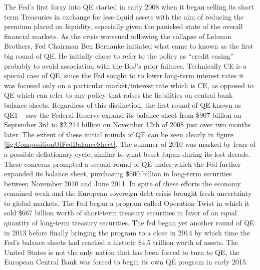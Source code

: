 \documentclass[12pt]{report}
\begin{document}
The Fed's first foray into QE started in early 2008 when it began selling its short term Treasuries in exchange for less-liquid assets with the aim of reducing the premium placed on liquidity, especially given the panicked state of the overall financial markets.\autocite[467]{blinder2010quantitative}
As the crisis worsened following the collapse of Lehman Brothers, Fed Chairman Ben Bernanke initiated what came to known as the first big round of QE. He initially chose to refer to the policy as ``credit easing'' probably to avoid association with the BoJ's prior failures.\autocite[465]{blinder2010quantitative}
Technically CE is a special case of QE, since the Fed sought to to lower long-term interest rates it was focused only on a particular market/interest rate which is CE, as opposed to QE which can refer to any policy that raises the liabilities on central bank balance sheets.\autocite[55]{fawley2013four}
Regardless of this distinction, the first round of QE known as QE1 -- saw the Federal Reserve expand its balance sheet from \$907 billion on September 3rd to \$2,214 billion on November 12th of 2008 just over two months later.\autocite[468]{blinder2010quantitative}
The extent of these initial rounds of QE can be seen clearly in figure \ref{fig:CompositionOfFedBalanceSheet}.
The summer of 2010 was marked by fears of a possible deflationary cycle, similar to what beset Japan during its lost decade.\autocite[1]{ricketts2014rise}
These concerns prompted a second round of QE under which the Fed further expanded its balance sheet, purchasing \$600 billion in long-term securities between November 2010 and June 2011.\autocite[1]{ricketts2014rise}
In spite of these efforts the economy remained weak and the European sovereign debt crisis brought fresh uncertainty to global markets.
The Fed began a program called Operation Twist in which it sold \$667 billion worth of short-term treasury securities in favor of an equal quantity of long-term treasury securities.\autocite[1]{ricketts2014rise}
The fed began yet another round of QE in 2013\autocite[1]{ricketts2014rise} before finally bringing the program to a close in 2014 by which time the Fed's balance sheets had reached a historic \$4.5 trillion worth of assets.\autocite{nytFed}
The United States is not the only nation that has been forced to turn to QE, the European Central Bank was forced to begin its own QE program in early 2015.\autocite{economistQEGermany}

\iffalse
There is considerable concern that the policy will not be as effective in Europe as it has proven in the United States.\autocite{economistQEGermany}
Prior to Quantitative Easing, Europe had actually begun to enter deflation indicating that popular concern that the policy would lead to hyperinflation are largely irrational.\autocite{economistQEGermany}
\autocite{economistQEGermany}
\fi
\end{document}
